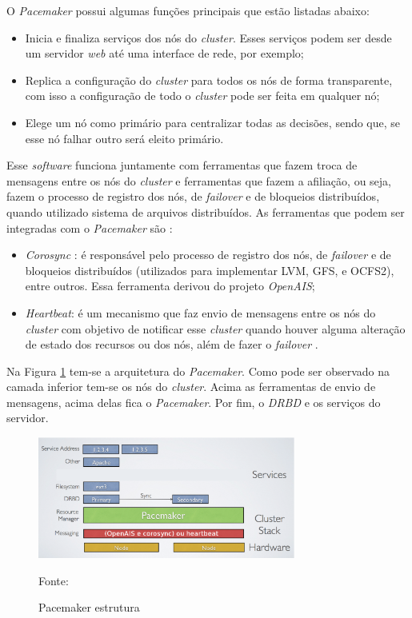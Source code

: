 O \textit{Pacemaker} possui algumas funções principais que estão listadas abaixo:
\begin{itemize}
 \item Inicia e finaliza serviços dos nós do \textit{cluster}. Esses serviços podem ser desde um servidor \textit{web} até uma interface de 
 rede, por exemplo;
 \item Replica a configuração do \textit{cluster} para todos os nós de forma transparente, com isso a configuração de todo o \textit{cluster} 
 pode ser feita em qualquer nó;
 \item Elege um nó como primário para centralizar todas as decisões, sendo que, se esse nó falhar outro será eleito primário.
\end{itemize}

Esse \textit{software} funciona juntamente com ferramentas que fazem troca de mensagens entre os nós do \textit{cluster} e ferramentas que 
fazem a afiliação, ou seja, fazem o processo de registro dos nós, de \textit{failover} e de bloqueios distribuídos, quando utilizado sistema 
de arquivos distribuídos. As ferramentas que podem ser integradas com o \textit{Pacemaker} são \cite{pacemaker}:
\begin{itemize}
 \item \textit{Corosync} \cite{corosync}: é responsável pelo processo de registro dos nós, de \textit{failover} e de bloqueios distribuídos 
 (utilizados para implementar \ac{LVM}, \ac{GFS}, e \ac{OCFS2}), entre outros. Essa ferramenta derivou do projeto \textit{OpenAIS};
 \item \textit{Heartbeat}: é um mecanismo que faz envio de mensagens entre os nós do \textit{cluster} com objetivo de notificar esse 
 \textit{cluster} quando houver alguma alteração de estado dos recursos ou dos nós, além de fazer o \textit{failover} \cite{clusterlabs}.
\end{itemize}


Na Figura \ref{fig:pacemaker_tools} tem-se a arquitetura do \textit{Pacemaker}. Como pode ser observado na camada inferior tem-se os nós do 
\textit{cluster}. Acima as ferramentas de envio de mensagens, acima delas fica o \textit{Pacemaker}. Por fim, o \textit{DRBD} e os 
serviços do servidor.

\begin{figure}[h!]
 \centering
 \includegraphics[width=320px]{img/pacemaker_tools.eps}
 \caption{Pacemaker estrutura}
 Fonte: \citet{pacemaker}
 \label{fig:pacemaker_tools}
\end{figure}

